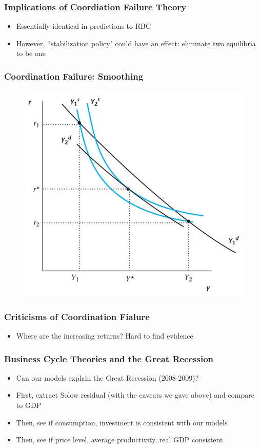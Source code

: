 \documentclass{beamer}
\begin{document}
\begin{frame}
\frametitle[alignment=center]{Implications of Coordiation Failure Theory}
\begin{itemize}
\item Essentially identical in predictions to RBC
\bigskip
\item However, ``stabilization policy" could have an effect: eliminate two equilibria to be one
\end{itemize}
\end{frame}

\begin{frame}
\frametitle[alignment=center]{Coordination Failure: Smoothing}
\begin{figure}
\centering
\includegraphics[scale=0.65]{Figures/W_Fig_13pt12.png}
\end{figure}
\end{frame}

\begin{frame}
\frametitle[alignment=center]{Criticisms of Coordination Fialure}
\begin{itemize}
\item Where are the increasing returns?  Hard to find evidence
\end{itemize}
\end{frame}

\begin{frame}
\frametitle[alignment=center]{Business Cycle Theories and the Great Recession}
\begin{itemize}
\item Can our models explain the Great Recession (2008-2009)?
\bigskip
\item First, extract Solow residual (with the caveats we gave above) and compare to GDP
\bigskip
\item Then, see if consumption, investment is consistent with our models
\bigskip
\item Then, see if price level, average productivity, real GDP consistent
\end{itemize}
\end{frame}
\end{document}
